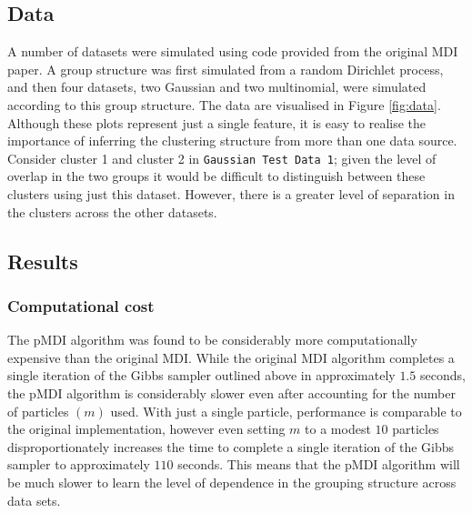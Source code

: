 \documentclass[10pt,a4paper]{article}
\begin{document}
\subsection{Data}
A number of datasets were simulated using code provided from the original MDI paper. A group structure was first simulated from a random Dirichlet process, and then four datasets, two Gaussian and two multinomial, were simulated according to this group structure. The data are visualised in Figure \ref{fig:data}. Although these plots represent just a single feature, it is easy to realise the importance of inferring the clustering structure from more than one data source. Consider cluster 1 and cluster 2 in \texttt{Gaussian Test Data 1}; given the level of overlap in the two groups it would be difficult to distinguish between these clusters using just this dataset. However, there is a greater level of separation in the clusters across the other datasets.



\subsection{Results}
\subsubsection{Computational cost}
The pMDI algorithm was found to be considerably more computationally expensive than the original MDI. While the original MDI algorithm completes a single iteration of the Gibbs sampler outlined above in approximately $1.5$ seconds, the pMDI algorithm is considerably slower even after accounting for the number of particles $(m)$ used. With just a single particle, performance is comparable to the original implementation, however even setting $m$ to a modest $10$ particles disproportionately increases the time to complete a single iteration of the Gibbs sampler to approximately $110$ seconds. This means that the pMDI algorithm will be much slower to learn the level of dependence in the grouping structure across data sets.
\end{document}
